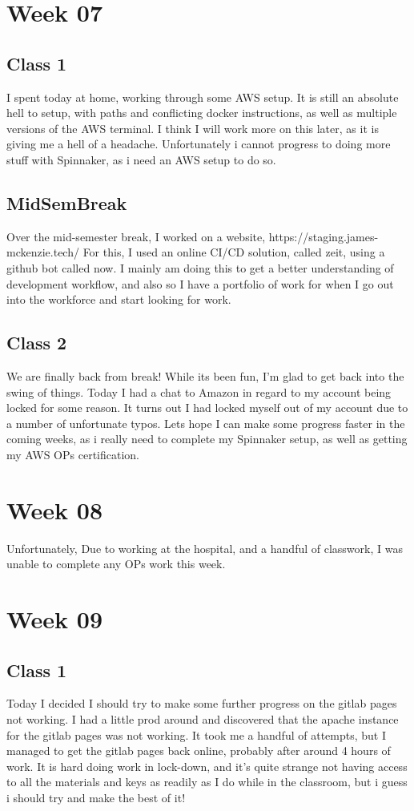\documentclass{article}
\begin{document}
\section{Week 07}
\subsection{Class 1}
I spent today at home, working through some AWS setup. It is still an absolute hell to setup, with paths and conflicting docker instructions, 
as well as multiple versions of the AWS terminal. I think I will work more on this later, as it is giving me a hell of a headache. Unfortunately
i cannot progress to doing more stuff with Spinnaker, as i need an AWS setup to do so.
\subsection*{MidSemBreak}
Over the mid-semester break, I worked on a website, https://staging.james-mckenzie.tech/ For this, I used an online CI/CD solution,
called zeit, using a github bot called now. I mainly am doing this to get a better understanding of development workflow, and also so I
have a portfolio of work for when I go out into the workforce and start looking for work.
\subsection{Class 2}
We are finally back from break! While its been fun, I'm glad to get back into the swing of things. Today I had a chat to
Amazon in regard to my account being locked for some reason. It turns out I had locked myself out of my account due to a number
of unfortunate typos. Lets hope I can make some progress faster in the coming weeks, as i really need to complete my Spinnaker setup,
as well as getting my AWS OPs certification. 

\section{Week 08}
Unfortunately, Due to working at the hospital, and a handful of classwork, I was unable to complete any OPs work this week. 
\section{Week 09}
\subsection {Class 1}
Today I decided I should try to make some further progress on the gitlab pages not working. I had a little prod around and discovered that
the apache instance for the gitlab pages was not working. It took me a handful of attempts, but I managed to get the gitlab pages back 
online, probably after around 4 hours of work. It is hard doing work in lock-down, and it's quite strange not having access to all the materials
and keys as readily as I do while in the classroom, but i guess i should try and make the best of it!
\end{document}
